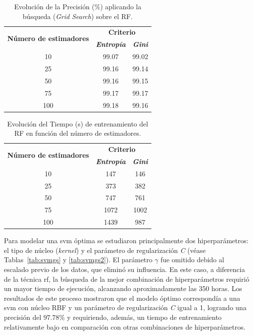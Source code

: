 \begin{table}[H]
\centering
\begin{tabular}{|c|c|c|}
\hline
\multirow{2}{*}{\textbf{Número de estimadores}} & \multicolumn{2}{c|}{\textbf{Criterio}} \\ \cline{2-3}
 & \textit{\textbf{Entropía}} & \textit{\textbf{Gini}} \\ \hline
10  & 99.07 & 99.02 \\ \hline
25  & 99.16 & 99.14 \\ \hline
50  & 99.16 & 99.15 \\ \hline
75  & 99.17 & 99.17 \\ \hline
100 & 99.18 & 99.16 \\ \hline
\end{tabular}
\caption{Evolución de la Precisión (\%) aplicando la búsqueda (\textit{Grid Search}) sobre el RF.}
\label{tab:rfgs_precision}
\end{table}

\begin{table}[H]
\centering
\begin{tabular}{|c|c|c|}
\hline
\multirow{2}{*}{\textbf{Número de estimadores}} & \multicolumn{2}{c|}{\textbf{Criterio}} \\ \cline{2-3}
 & \textit{\textbf{Entropía}} & \textit{\textbf{Gini}} \\ \hline
10   & 147  & 146  \\ \hline
25   & 373  & 382  \\ \hline
50   & 747  & 761  \\ \hline
75   & 1072 & 1002 \\ \hline
100  & 1439 & 987  \\ \hline
\end{tabular}
\caption{Evolución del Tiempo (s) de entrenamiento del RF en función del número de estimadores.}
\label{tab:rfgs_tiempo}
\end{table}


Para modelar una \gls{svm} óptima se estudiaron principalmente dos hiperparámetros: el tipo de núcleo (\textit{kernel}) y el parámetro de regularización \textit{C} (véase Tablas~\ref{tab:svmgs} y \ref{tab:svmgs2}). El parámetro \( \gamma \) fue omitido debido al escalado previo de los datos, que eliminó su influencia. En este caso, a diferencia de la técnica \gls{rf}, la búsqueda de la mejor combinación de hiperparámetros requirió un mayor tiempo de ejecución, alcanzando aproximadamente las 350 horas.  Los resultados de este proceso mostraron que el modelo óptimo correspondía a una \gls{svm} con núcleo RBF y un parámetro de regularización \textit{C} igual a 1, logrando una precisión del 97.78\% y requiriendo, además, un tiempo de entrenamiento relativamente bajo en comparación con otras combinaciones de hiperparámetros.  

